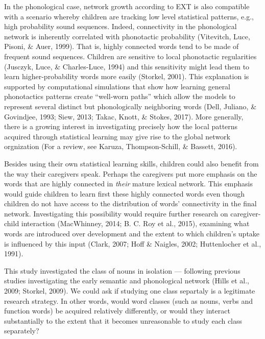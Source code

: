 \documentclass[english,floatsintext,man]{apa6}
\theoremstyle{definition}
\theoremstyle{definition}
\theoremstyle{definition}
\theoremstyle{remark}
\begin{document}
In the phonological case, network growth according to EXT is also
compatible with a scenario whereby children are tracking low level
statistical patterns, e.g., high probability sound sequences. Indeed,
connectivity in the phonological network is inherently correlated with
phonotactic probability (Vitevitch, Luce, Pisoni, \& Auer, 1999). That
is, highly connected words tend to be made of frequent sound sequences.
Children are sensitive to local phonotactic regularities (Jusczyk, Luce,
\& Charles-Luce, 1994) and this sensitivity might lead them to learn
higher-probability words more easily (Storkel, 2001). This explanation
is supported by computational simulations that show how learning general
phonotactics patterns create \enquote{well-worn paths} which allow the
models to represent several distinct but phonologically neighboring
words (Dell, Juliano, \& Govindjee, 1993; Siew, 2013; Takac, Knott, \&
Stokes, 2017). More generally, there is a growing interest in
investigating precisely how the local patterns acquired through
statistical learning may give rise to the global network orgnization
(For a review, see Karuza, Thompson-Schill, \& Bassett, 2016).

Besides using their own statistical learning skills, children could also
benefit from the way their caregivers speak. Perhaps the caregivers put
more emphasis on the words that are highly connected in \emph{their}
mature lexical network. This emphasis would guide children to learn
first these highly connected words even though children do not have
access to the distribution of words' connectivity in the final network.
Investigating this possibility would require further research on
caregiver-child interaction (MacWhinney, 2014; B. C. Roy et al., 2015),
examining what words are introduced over development and the extent to
which children's uptake is influenced by this input (Clark, 2007; Hoff
\& Naigles, 2002; Huttenlocher et al., 1991).

This study investigated the class of nouns in isolation --- following
previous studies investigating the early semantic and phonological
network (Hills et al., 2009; Storkel, 2009). We could ask if studying
one class separtaly is a legitimate research strategy. In other words,
would word classes (such as nouns, verbs and function words) be acquired
relatively differently, or would they interact substantially to the
extent that it becomes unreasonable to study each class separately?
\end{document}
